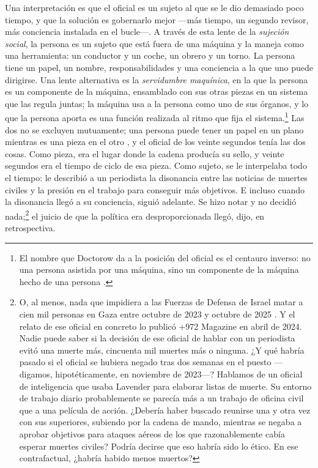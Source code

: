 Una interpretación es que el oficial es un sujeto al que se le dio demasiado poco tiempo, y que la solución es gobernarlo mejor —más tiempo, un segundo revisor, más conciencia instalada en el bucle—. A través de esta lente de la \emph{sujeción social}, la persona es un sujeto que está fuera de una máquina y la maneja como una herramienta: un conductor y un coche, un obrero y un torno. La persona tiene un papel, un nombre, responsabilidades y una conciencia a la que uno puede dirigirse. Una lente alternativa es la \emph{servidumbre maquínica}, en la que la persona es un componente de la máquina, ensamblado con sus otras piezas en un sistema que las regula juntas; la máquina usa a la persona como uno de sus órganos, y lo que la persona aporta es una función realizada al ritmo que fija el sistema.\footnote{El nombre que Doctorow da a la posición del oficial es el centauro inverso: no una persona asistida por una máquina, sino un componente de la máquina hecho de una persona \autocite{doctorow2026reversecentaur}.} Las dos no se excluyen mutuamente; una persona puede tener un papel en un plano mientras es una pieza en el otro \autocite[Meseta 13, «The Apparatus of Capture»: hay servidumbre cuando los propios seres humanos son piezas constitutivas de una máquina que componen entre ellos y con otras cosas, bajo el control y la dirección de una unidad superior, y sujeción cuando la unidad superior constituye al ser humano como sujeto vinculado a un nuevo objeto exterior, que puede ser un animal, una herramienta o incluso una máquina]{deleuze1987plateaus}, y el oficial de los veinte segundos tenía las dos cosas. Como pieza, era el lugar donde la cadena producía su sello, y veinte segundos era el tiempo de ciclo de esa pieza. Como sujeto, se le interpelaba todo el tiempo: le describió a un periodista la disonancia entre las noticias de muertes civiles y la presión en el trabajo para conseguir más objetivos. E incluso cuando la disonancia llegó a su conciencia, siguió adelante. Se hizo notar y no decidió nada;\footnote{O, al menos, nada que impidiera a las Fuerzas de Defensa de Israel matar a cien mil personas en Gaza entre octubre de 2023 y octubre de 2025 \autocite{gomezugarte2025uncertainty,acosta2026gaza,economist2025gaza}. Y el relato de ese oficial en concreto lo publicó +972 Magazine en abril de 2024. Nadie puede saber si la decisión de ese oficial de hablar con un periodista evitó una muerte más, cincuenta mil muertes más o ninguna. ¿Y qué habría pasado si el oficial se hubiera negado tras dos semanas en el puesto —digamos, hipotéticamente, en noviembre de 2023—? Hablamos de un oficial de inteligencia que usaba Lavender para elaborar listas de muerte. Su entorno de trabajo diario probablemente se parecía más a un trabajo de oficina civil que a una película de acción. ¿Debería haber buscado reunirse una y otra vez con sus superiores, subiendo por la cadena de mando, mientras se negaba a aprobar objetivos para ataques aéreos de los que razonablemente cabía esperar muertes civiles? Podría decirse que eso habría sido lo ético. En ese contrafactual, ¿habría habido menos muertos?} el juicio de que la política era desproporcionada llegó, dijo, en retrospectiva.

